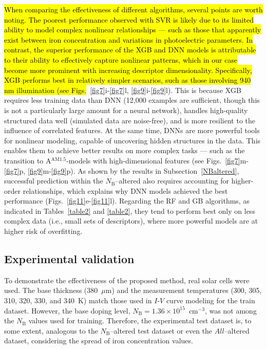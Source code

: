 \documentclass[a4paper,fleqn,draft]{cas-sc}
\begin{document}
\textcolor[rgb]{1.00,0.07,0.00}{
\hl{
When comparing the effectiveness of different algorithms, several points are worth noting.
The poorest performance observed with SVR is likely due to its limited ability
to model complex nonlinear relationships ---
such as those that apparently exist between iron concentration and variations in photoelectric parameters.
In contrast, the superior performance of the XGB and DNN models is attributable to
their ability to effectively capture nonlinear patterns, which in our case become more prominent with increasing descriptor dimensionality.
Specifically, XGB performs best in relatively simpler scenarios, such as those involving 940 nm illumination
(see Figs.}~\ref{fig7}i-\ref{fig7}l, \ref{fig9}i-\ref{fig9}l).
This is because XGB requires less training data than DNN
(12,000 examples are sufficient, though this is not a particularly large amount for a neural network),
handles high-quality structured data well (simulated data are noise-free),
and is more resilient to the influence of correlated features.
At the same time, DNNs are more powerful tools for nonlinear modeling,
capable of uncovering hidden structures in the data.
This enables them to achieve better results on more complex tasks ---
such as the transition to A$^\mathrm{AM1.5}$-models with high-dimensional features
(see Figs.~\ref{fig7}m-\ref{fig7}p, \ref{fig9}m-\ref{fig9}p).
As shown by the results in Subsection~\ref{NBaltered}, successful prediction within the
$N_\mathrm{B}$--altered also requires accounting for higher-order relationships,
which explains why DNN models achieved the best performance (Figs.~\ref{fig11}e-\ref{fig11}l).
Regarding the RF and GB algorithms, as indicated in Tables~\ref{table2} and \ref{table2},
they tend to perform best only on less complex data
(i.e., small sets of descriptors), where more powerful models are at higher risk of overfitting.
}


\subsection{Experimental validation}


To demonstrate the effectiveness of the proposed method, real solar cells were used.
The base thickness (380~$\mu$m) and the measurement temperatures (300, 305, 310, 320, 330, and 340~K) match those used in $I$-$V$ curve modeling for the train dataset.
However, the base doping level, $N_\mathrm{B}=1.36\times10^{15}$~cm$^{-3}$, was not among the $N_\mathrm{B}$ values used for training.
Therefore, the experimental test dataset is, to some extent, analogous to the $N_\mathrm{B}$--altered test dataset or even the $All$--altered dataset, considering the spread of iron concentration values.
\end{document}
